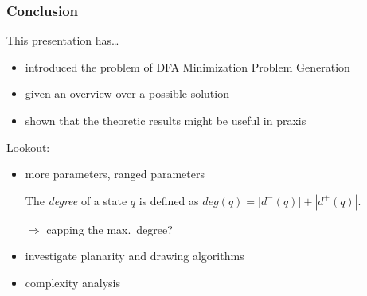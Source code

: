 \documentclass[10pt,usenames,dvipsnames]{beamer}%
\newcommand{\gregorColor}{violet}
\newcommand{\gregor}[1]{\textcolor{\gregorColor}{#1}}
\begin{document}
%		
%	
	
	

	\begin{frame}
		\frametitle{Conclusion}
		
		This presentation has\ldots
		\begin{itemize}
			\item introduced the problem of DFA Minimization Problem Generation
			\item given an overview over a possible solution
			\item shown that the theoretic results might be useful in praxis
		\end{itemize}\pause
		Lookout:
		\begin{itemize}
			\item more parameters, ranged parameters
			
			The \emph{degree} of a state $q$ is defined as $deg(q) = |d^-(q)| + |d^+(q)|$.
			
			$\Rightarrow$ capping the max.\ degree?
			
			\item investigate planarity and drawing algorithms
			\item complexity analysis
		\end{itemize}\pause
		\vspace{0.4cm}
		\begin{center}
		\end{center}
	
	\end{frame}
\end{document}
